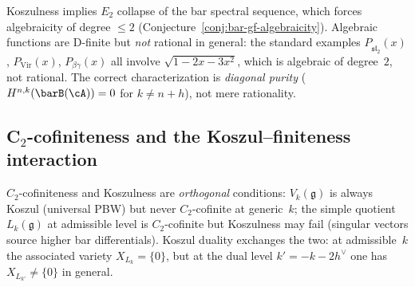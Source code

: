 \noindent
Koszulness implies $E_2$ collapse of the bar spectral sequence, which
forces algebraicity of degree $\leq 2$
(Conjecture~\ref{conj:bar-gf-algebraicity}). Algebraic functions
are D-finite but \emph{not} rational in general: the standard
examples $P_{\widehat{\mathfrak{sl}}_2}(x)$,
$P_{\mathrm{Vir}}(x)$, $P_{\beta\gamma}(x)$ all involve
$\sqrt{1 - 2x - 3x^2}$, which is algebraic of degree~$2$, not
rational. The correct characterization is \emph{diagonal purity}
($H^{n,k}(\barB(\cA)) = 0$ for $k \neq n + h$),
not mere rationality.
\label{conj:rationality-vs-koszulness}

\subsection{C$_2$-cofiniteness and the Koszul--finiteness interaction}
\label{conj:c2-cofiniteness-koszul-interaction}

$C_2$-cofiniteness and Koszulness are \emph{orthogonal} conditions:
$V_k(\mathfrak{g})$ is always Koszul (universal PBW) but never
$C_2$-cofinite at generic~$k$; the simple quotient
$L_k(\mathfrak{g})$ at admissible level is $C_2$-cofinite but
Koszulness may fail (singular vectors source higher bar
differentials). Koszul duality exchanges the two: at
admissible~$k$ the associated variety
$X_{L_k} = \{0\}$, but at the dual level $k' = -k - 2h^\vee$ one
has $X_{L_{k'}} \neq \{0\}$ in general.

